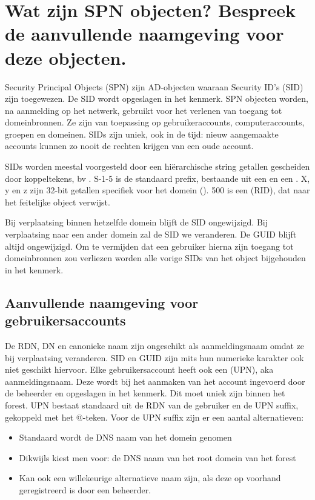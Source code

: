 \section{Wat zijn SPN objecten? Bespreek de aanvullende naamgeving voor deze
objecten.}

Security Principal Objects (SPN) zijn AD-objecten waaraan Security ID's (SID)
zijn toegewezen. De SID wordt opgeslagen in het  kenmerk.
SPN objecten worden, na aanmelding op het netwerk, gebruikt voor het verlenen
van toegang tot domeinbronnen. Ze zijn van toepassing op gebruikeraccounts,
computeraccounts, groepen en domeinen. SIDs zijn uniek, ook in de tijd: nieuw
aangemaakte accounts kunnen zo nooit de rechten krijgen van een oude account.

SIDs worden meestal voorgesteld door een hiërarchische string getallen
gescheiden door koppeltekens, bv . S-1-5 is de standaard
prefix, bestaande uit een  en een . X, y en z zijn 32-bit getallen specifiek voor het domein
(). 500 is een 
(RID), dat naar het feitelijke object verwijst.

Bij verplaatsing binnen hetzelfde domein blijft de SID ongewijzigd. Bij
verplaatsing naar een ander domein zal de SID we veranderen. De GUID blijft
altijd ongewijzigd. Om te vermijden dat een gebruiker hierna zijn toegang tot
domeinbronnen zou verliezen worden alle vorige SIDs van het object bijgehouden
in het  kenmerk.

\subsection{Aanvullende naamgeving voor gebruikersaccounts}

De RDN, DN en canonieke naam zijn ongeschikt als aanmeldingsnaam omdat ze bij
verplaatsing veranderen. SID en GUID zijn mits hun numerieke karakter ook niet
geschikt hiervoor. Elke gebruikersaccount heeft ook een  (UPN), aka aanmeldingsnaam. Deze wordt bij het aanmaken van het account
ingevoerd door de beheerder en opgeslagen in het 
kenmerk. Dit moet uniek zijn binnen het forest. UPN bestaat standaard uit de RDN
van de gebruiker en de UPN suffix, gekoppeld met het @-teken.
Voor de UPN suffix zijn er een aantal alternatieven:
\begin{itemize}
	\item Standaard wordt de DNS naam van het domein genomen
	\item Dikwijls kiest men voor: de DNS naam van het root domein van het
		forest
	\item Kan ook een willekeurige alternatieve naam zijn, als deze op
		voorhand geregistreerd is door een beheerder.
\end{itemize}

